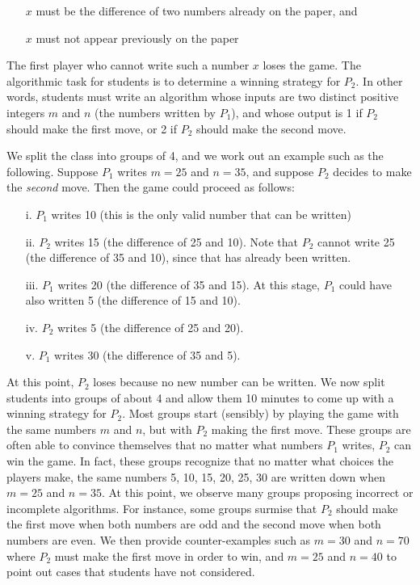 \begin{multicols}{2}
\begin{itemize}
\item[\bullet] $x$ must be the difference of two numbers already on the paper, and

\item[\bullet] $x$ must not appear previously on the paper
\end{itemize} 

The first player who cannot write such a number $x$ loses the game. The algorithmic task for students is to determine a winning strategy for $P_{2}$. In other words, students must write an algorithm whose inputs are two distinct positive integers $m$ and $n$ (the numbers written by $P_{1}$), and whose output is 1 if $P_{2}$ should make the first move, or 2 if $P_{2}$ should make the second move.

We split the class into groups of 4, and we work out an example such as the following. Suppose $P_{1}$ writes $m = 25$ and $n = 35$, and suppose $P_{2}$ decides to make the \textit{second} move. Then the game could proceed as follows:
\begin{itemize}
\item[i.] $P_{1}$ writes 10 (this is the only valid number that can be written)
\item[ii.] $P_{2}$ writes 15 (the difference of 25 and 10). Note that $P_{2}$ cannot write 25 (the difference of 35 and 10), since that has already been written.
\item[iii.] $P_{1}$ writes 20 (the difference of 35 and 15). At this stage, $P_{1}$ could have also written 5 (the difference of 15 and 10).
\item[iv.] $P_{2}$ writes 5 (the difference of 25 and 20).
\item[v.] $P_{1}$ writes 30 (the difference of 35 and 5).
\end{itemize}

At this point, $P_{2}$ loses because no new number can be written. We now split students into groups of about 4 and allow them 10 minutes to come up with a winning strategy for $P_{2}$. Most groups start (sensibly) by playing the game with the same numbers $m$ and $n$, but with $P_{2}$ making the first move. These groups are often able to convince themselves that no matter what numbers $P_{1}$ writes, $P_{2}$ can win the game. In fact, these groups recognize that no matter what choices the players make, the same numbers 5, 10, 15, 20, 25, 30 are written down when $m = 25$ and $n = 35$. At this point, we observe many groups proposing incorrect or incomplete algorithms. For instance, some groups surmise that $P_{2}$ should make the first move when both numbers are odd and the second move when both numbers are even. We then provide counter-examples such as $m = 30$ and $n = 70$ where $P_{2}$ must make the first move in order to win, and $m = 25$ and $n = 40$ to point out cases that students have not considered.



\end{multicols}
